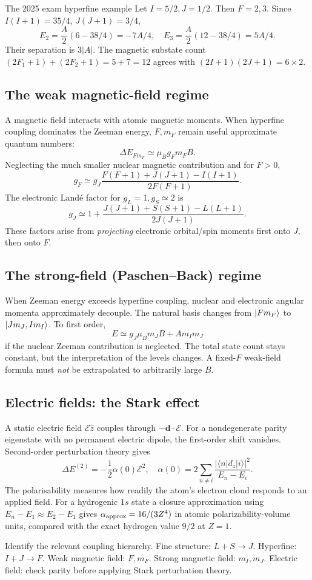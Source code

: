 \begin{worked}{The 2025 exam hyperfine example}
Let \(I=5/2,J=1/2\).
Then \(F=2,3\).
Since \(I(I+1)=35/4\),
\(J(J+1)=3/4\),
\[
E_2=\frac A2(6-38/4)=
\boxed{-7A/4},
\quad
E_3=\frac A2(12-38/4)=
\boxed{5A/4}.
\]
Their separation is \(3|A|\).
The magnetic substate count
\((2F_1+1)+(2F_2+1)=5+7=12\)
agrees with \((2I+1)(2J+1)=6\times2\).
\end{worked}

\subsection{The weak magnetic-field regime}
A magnetic field interacts with atomic
magnetic moments. When hyperfine coupling
dominates the Zeeman energy,
\(F,m_F\) remain useful approximate
quantum numbers:
\[
\boxed{\Delta E_{Fm_F}\simeq
\mu_Bg_Fm_FB.}
\]
Neglecting the much smaller nuclear
magnetic contribution and for \(F>0\),
\[
g_F\simeq g_J
\frac{F(F+1)+J(J+1)-I(I+1)}
{2F(F+1)}.
\]
The electronic Land\'e factor for
\(g_L=1,g_S\simeq2\) is
\[
\boxed{g_J\simeq1+
\frac{J(J+1)+S(S+1)-L(L+1)}
{2J(J+1)}}.
\]
These factors arise from \emph{projecting}
electronic orbital/spin moments first
onto \(J\), then onto \(F\).

\subsection{The strong-field (Paschen--Back) regime}
When Zeeman energy exceeds hyperfine
coupling, nuclear and electronic
angular momenta approximately decouple.
The natural basis changes from
\(\left\lvert Fm_F\right\rangle\) to \(\left\lvert Jm_J,Im_I\right\rangle\).
To first order,
\[
E\simeq g_J\mu_Bm_JB+Am_Im_J
\]
if the nuclear Zeeman contribution is
neglected. The total state count stays
constant, but the interpretation
of the levels changes.
A fixed-\(F\) weak-field formula
must \emph{not} be extrapolated
to arbitrarily large \(B\).

\subsection{Electric fields: the Stark effect}
A static electric field \(\mathcal E\hat z\)
couples through \(-\mathbf d\cdot\boldsymbol{\mathcal E}\).
For a nondegenerate parity eigenstate
with no permanent electric dipole,
the first-order shift vanishes.
Second-order perturbation theory gives
\[
\boxed{\Delta E^{(2)}=-\frac12
\alpha(0)\mathcal E^2,\quad
\alpha(0)=2\sum_{n\ne i}
\frac{|\langle n|d_z|i\rangle|^2}{E_n-E_i}}.
\]
The polarisability measures how readily
the atom's electron cloud responds to
an applied field. For a hydrogenic \(1s\)
state a closure approximation using
\(E_n-E_1\approx E_2-E_1\) gives
\(\alpha_{\rm approx}=16/(3Z^4)\)
in atomic polarizability-volume units,
compared with the exact hydrogen value
\(9/2\) at \(Z=1\).

\begin{checkpoint}
Identify the relevant coupling hierarchy.
Fine structure: \(L+S\to J\).
Hyperfine: \(I+J\to F\).
Weak magnetic field: \(F,m_F\).
Strong magnetic field: \(m_I,m_J\).
Electric field: check parity before
applying Stark perturbation theory.
\end{checkpoint}
